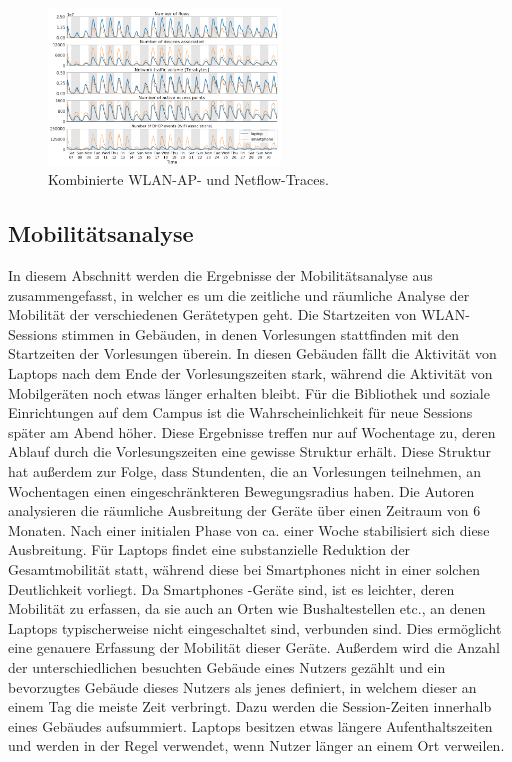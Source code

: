 \documentclass[12pt, a4paper]{article}
\begin{document}
\begin{figure}[H]
    \centering
    \includegraphics[width=0.55\textwidth]{img/traces.png}
    \caption{Kombinierte WLAN-AP- und Netflow-Traces. \cite{Alipour2018}}
    \label{fig:traces}
\end{figure}

\subsection{Mobilitätsanalyse}
\label{sec:phase2_a}

In diesem Abschnitt werden die Ergebnisse der Mobilitätsanalyse aus \cite{Alipour2018} zusammengefasst, in welcher es
um die zeitliche und räumliche Analyse der Mobilität der verschiedenen Gerätetypen geht.
Die Startzeiten von WLAN-Sessions stimmen in Gebäuden, in denen Vorlesungen stattfinden mit den Startzeiten der Vorlesungen überein.
In diesen Gebäuden fällt die Aktivität von Laptops nach dem Ende der Vorlesungszeiten stark, während die Aktivität von Mobilgeräten
noch etwas länger erhalten bleibt. Für die Bibliothek und soziale Einrichtungen auf dem Campus ist die Wahrscheinlichkeit
für neue Sessions später am Abend höher. Diese Ergebnisse treffen nur auf Wochentage zu, deren Ablauf durch
die Vorlesungszeiten eine gewisse Struktur erhält. Diese Struktur hat außerdem zur Folge, dass Stundenten, die an 
Vorlesungen teilnehmen, an Wochentagen einen eingeschränkteren Bewegungsradius haben. Die Autoren
analysieren die räumliche Ausbreitung der Geräte über einen Zeitraum von $6$ Monaten.
Nach einer initialen Phase von ca. einer Woche stabilisiert sich diese Ausbreitung. Für Laptops findet eine 
substanzielle Reduktion der Gesamtmobilität statt, während diese bei Smartphones nicht in einer solchen Deutlichkeit vorliegt.
Da Smartphones -Geräte sind, ist es leichter, deren Mobilität zu erfassen, da sie auch an Orten
wie Bushaltestellen etc., an denen Laptops typischerweise nicht eingeschaltet sind, verbunden sind.
Dies ermöglicht eine genauere Erfassung der Mobilität dieser Geräte.
Außerdem wird die Anzahl der unterschiedlichen besuchten Gebäude eines Nutzers gezählt und ein bevorzugtes
Gebäude dieses Nutzers als jenes definiert, in welchem dieser an einem Tag die meiste Zeit verbringt.
Dazu werden die Session-Zeiten innerhalb eines Gebäudes aufsummiert.
Laptops besitzen etwas längere Aufenthaltszeiten und werden in der Regel verwendet, wenn Nutzer länger an einem Ort verweilen.
\end{document}
